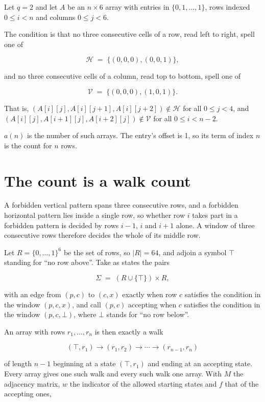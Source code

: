 \documentclass[11pt]{article}
\theoremstyle{definition}
\begin{document}
Let $q = 2$ and let $A$ be an $n \times 6$ array with entries in $\{0,1,\dots,1\}$, rows indexed $0 \le i < n$ and columns $0 \le j < 6$.

The condition is that no three consecutive cells of a row, read left to right, spell one of

\[\mathcal{H} \;=\; \{(0,0,0), (0,0,1)\},\]

and no three consecutive cells of a column, read top to bottom, spell one of

\[\mathcal{V} \;=\; \{(0,0,0), (1,0,1)\}.\]

That is, $(A[i][j],A[i][j{+}1],A[i][j{+}2]) \notin \mathcal{H}$ for all $0 \le j < 4$, and $(A[i][j],A[i{+}1][j],A[i{+}2][j]) \notin \mathcal{V}$ for all $0 \le i < n-2$.

$a(n)$ is the number of such arrays. The entry's offset is 1, so its term of index $n$ is the count for $n$ rows.

\section{The count is a walk count}

A forbidden vertical pattern spans three consecutive rows, and a forbidden horizontal pattern lies inside a single row, so whether row $i$ takes part in a forbidden pattern is decided by rows $i-1$, $i$ and $i+1$ alone. A window of three consecutive rows therefore decides the whole of its middle row.

Let $R = \{0,\dots,1\}^{6}$ be the set of rows, so $|R| = 64$, and adjoin a symbol $\top$ standing for ``no row above''. Take as states the pairs

\[\Sigma \;=\; (R \cup \{\top\}) \times R,\]

with an edge from $(p,c)$ to $(c,x)$ exactly when row $c$ satisfies the condition in the window $(p,c,x)$, and call $(p,c)$ accepting when $c$ satisfies the condition in the window $(p,c,\bot)$, where $\bot$ stands for ``no row below''.

An array with rows $r_1,\dots,r_n$ is then exactly a walk

\[(\top,r_1) \to (r_1,r_2) \to \cdots \to (r_{n-1},r_n)\]

of length $n-1$ beginning at a state $(\top,r_1)$ and ending at an accepting state. Every array gives one such walk and every such walk one array. With $M$ the adjacency matrix, $w$ the indicator of the allowed starting states and $f$ that of the accepting ones,
\end{document}
